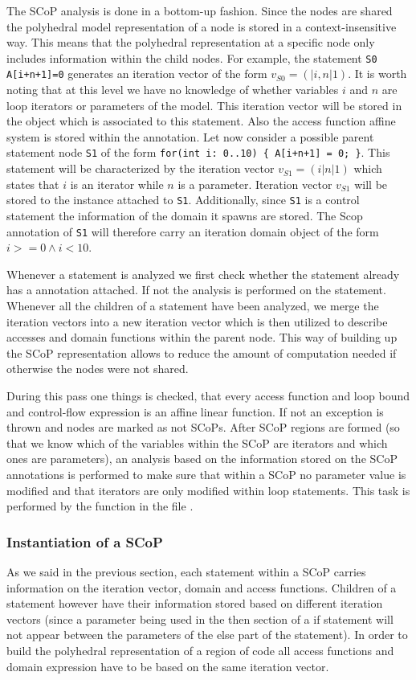 The SCoP analysis is done in a bottom-up fashion. Since the nodes are shared the
polyhedral model representation of a node is stored in a context-insensitive
way. This means that the polyhedral representation at a specific node only
includes information within the child nodes. For example, the statement {\tt S0}
{\tt A[i+n+1]=0} generates an iteration vector of the form $v_{S0} = (|i,n|1)$.
It is worth noting that at this level we have no knowledge of whether variables
$i$ and $n$ are loop iterators or parameters of the model. This iteration vector
will be stored in the  object which is associated to this
statement.  Also the access function affine system is stored within the
 annotation.  Let now consider a possible parent statement node
{\tt S1} of the form {\tt for(int i: 0..10) \{ A[i+n+1] = 0; \}}.  This
statement will be characterized by the iteration vector $v_{S1} = (i|n|1)$ which
states that $i$ is an iterator while $n$ is a parameter. Iteration vector
$v_{S1}$ will be stored to the  instance attached to {\tt S1}.
Additionally, since {\tt S1} is a control statement the information of the
domain it spawns are stored. The Scop annotation of {\tt S1} will therefore
carry an iteration domain object of the form $i>=0 \wedge i<10$. 

Whenever a statement is analyzed we first check whether the statement already
has a  annotation attached. If not the analysis is performed on
the statement. Whenever all the children of a statement have been analyzed,
we merge the iteration vectors into a new iteration vector which is then
utilized to describe accesses and domain functions within the parent node. This
way of building up the SCoP representation allows to reduce the amount of
computation needed if otherwise the nodes were not shared. 

During this pass one things is checked, that every access function and loop
bound and control-flow expression is an affine linear function. If not an
exception is thrown and nodes are marked as not SCoPs. After SCoP regions are
formed (so that we know which of the variables within the SCoP are iterators and
which ones are parameters), an analysis based on the information stored on the
SCoP annotations is performed to make sure that within a SCoP no parameter value
is modified and that iterators are only modified within loop statements. 
This task is performed by the  function in the file
.

\subsubsection{Instantiation of a SCoP}
As we said in the previous section, each statement within a SCoP carries
information on the iteration vector, domain and access functions. Children of a
statement however have their information stored based on different iteration
vectors (since a parameter being used in the then section of a if statement will
not appear between the parameters of the else part of the statement). In order to
build the polyhedral representation of a region of code all access functions and
domain expression have to be based on the same iteration vector. 

